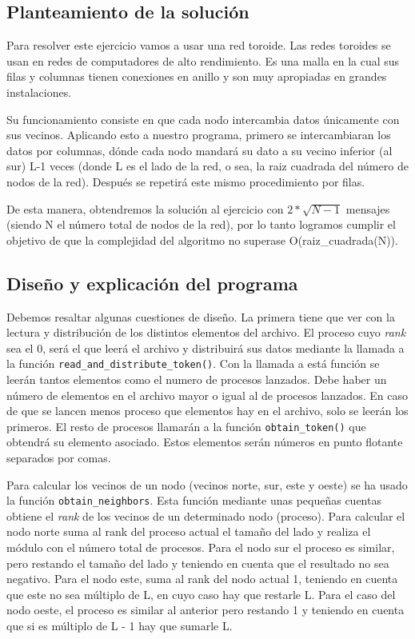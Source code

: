 \documentclass[11pt]{article}
\begin{document}
\subsection{Planteamiento de la solución}
Para resolver este ejercicio vamos a usar una red toroide. Las redes toroides se usan en redes de computadores de alto rendimiento. Es una malla en la cual sus filas y columnas tienen conexiones en anillo y son muy apropiadas en grandes instalaciones. 

Su funcionamiento consiste en que cada nodo intercambia datos únicamente con sus vecinos. Aplicando esto a nuestro programa, primero se intercambiaran los datos por columnas, dónde cada nodo mandará su dato a su vecino inferior (al sur) L-1 veces (donde L es el lado de la red, o sea, la raiz cuadrada del número de nodos de la red). Después se repetirá este mismo procedimiento por filas.

De esta manera, obtendremos la solución al ejercicio con $2*\sqrt{N-1}$ mensajes (siendo N el número total de nodos de la red), por lo tanto logramos cumplir el objetivo de que la complejidad del algoritmo no superase O(raiz\_cuadrada(N)).


\subsection{Diseño y explicación del programa}
Debemos resaltar algunas cuestiones de diseño. La primera tiene que ver con la lectura y distribución de los distintos elementos del archivo. El proceso cuyo \emph{rank} sea el 0, será el que leerá el archivo y distribuirá sus datos mediante la llamada a la función \texttt{read\_and\_distribute\_token()}. Con la llamada a está función se leerán tantos elementos como el numero de procesos lanzados. Debe haber un número de elementos en el archivo mayor o igual al de procesos lanzados. En caso de que se lancen menos proceso que elementos hay en el archivo, solo se leerán los primeros. El resto de procesos llamarán a la función \texttt{obtain\_token()} que obtendrá su elemento asociado. Estos elementos serán números en punto flotante separados por comas.

Para calcular los vecinos de un nodo (vecinos norte, sur, este y oeste) se ha usado la función \texttt{obtain\_neighbors}. Esta función mediante unas pequeñas cuentas obtiene el \emph{rank} de los vecinos de un determinado nodo (proceso). Para calcular el nodo norte suma al rank del proceso actual el tamaño del lado y realiza el módulo con el número total de procesos. Para el nodo sur el proceso es similar, pero restando el tamaño del lado y teniendo en cuenta que el resultado no sea negativo. Para el nodo este, suma al rank del nodo actual 1, teniendo en cuenta que este no sea múltiplo de L, en cuyo caso hay que restarle L. Para el caso del nodo oeste, el proceso es similar al anterior pero restando 1 y teniendo en cuenta que si es múltiplo de L - 1 hay que sumarle L. 
\end{document}
